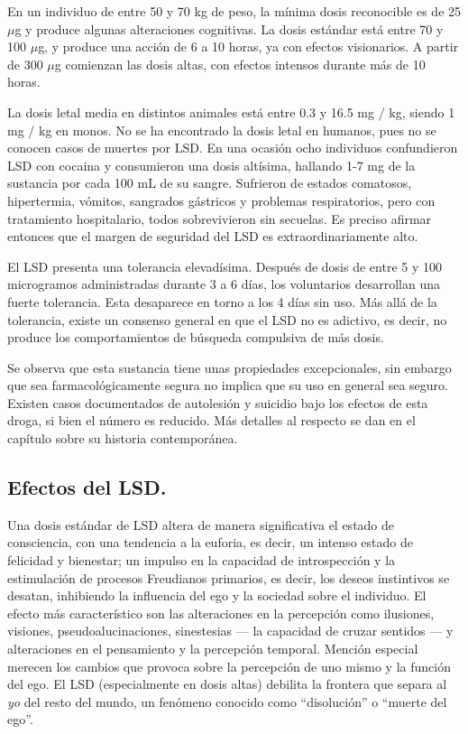En un individuo de entre 50 y 70 kg de peso, la mínima dosis reconocible es de 25 $\mu$g y produce algunas alteraciones cognitivas. La dosis estándar está entre 70 y 100 $\mu$g, y produce una acción de 6 a 10 horas, ya con efectos visionarios. A partir de 300 $\mu$g comienzan las dosis altas, con efectos intensos durante más de 10 horas.

La dosis letal media en distintos animales está entre 0.3 y 16.5 mg / kg, siendo 1 mg / kg en monos. No se ha encontrado la dosis letal en humanos, pues no se conocen casos de muertes por LSD. En una ocasión ocho individuos confundieron LSD con cocaina y consumieron una dosis altísima, hallando 1-7 mg de la sustancia por cada 100 mL de su sangre. Sufrieron de estados comatosos, hipertermia, vómitos, sangrados gástricos y problemas respiratorios, pero con tratamiento hospitalario, todos sobrevivieron sin secuelas. Es preciso afirmar entonces que el margen de seguridad del LSD es extraordinariamente alto.

El LSD presenta una tolerancia elevadísima. Después de dosis de entre 5 y 100 microgramos administradas durante 3 a 6 días, los voluntarios desarrollan una fuerte tolerancia. Esta desaparece en torno a los 4 días sin uso. Más allá de la tolerancia, existe un consenso general en que el LSD no es adictivo, es decir, no produce los comportamientos de búsqueda compulsiva de más dosis.

Se observa que esta sustancia tiene unas propiedades excepcionales, sin embargo que sea farmacológicamente segura no implica que su uso en general sea seguro. Existen casos documentados de autolesión y suicidio bajo los efectos de esta droga, si bien el número es reducido. Más detalles al respecto se dan en el capítulo sobre su historia contemporánea.

\newpage

\subsection{Efectos del LSD.}

Una dosis estándar de LSD altera de manera significativa el estado de consciencia, con una tendencia a la euforia, es decir, un intenso estado de felicidad y bienestar; un impulso en la capacidad de introspección y la estimulación de procesos Freudianos primarios, es decir, los deseos instintivos se desatan, inhibiendo la influencia del ego y la sociedad sobre el individuo. El efecto más característico son las alteraciones en la percepción como ilusiones, visiones, pseudoalucinaciones, sinestesias --- la capacidad de cruzar sentidos --- y alteraciones en el pensamiento y la percepción temporal. Mención especial merecen los cambios que provoca sobre la percepción de uno mismo y la función del ego. El LSD (especialmente en dosis altas) debilita la frontera que separa al \textit{yo} del resto del mundo, un fenómeno conocido como \enquote{disolución} o \enquote{muerte del ego}.

